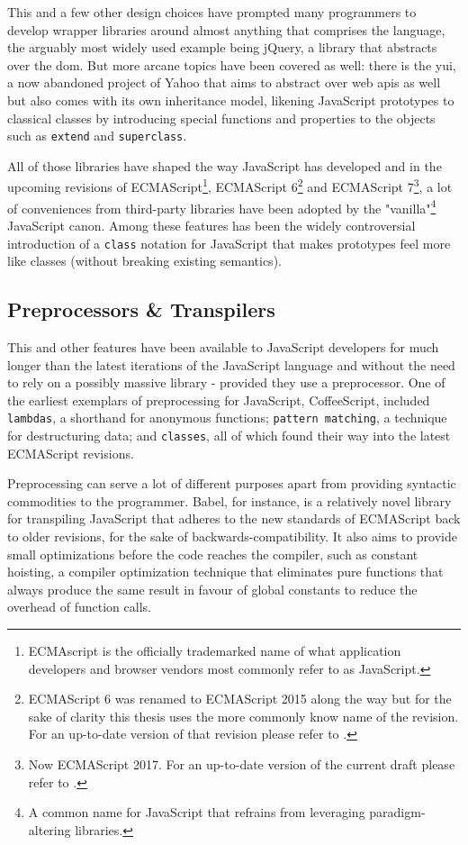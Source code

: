 \documentclass[oneside,11pt,xetex]{scrbook}
\begin{document}
This and a few other design choices have prompted many programmers to develop
wrapper libraries around almost anything that comprises the language, the arguably
most widely used example being jQuery, a library that abstracts over the \gls{dom}.
But more arcane topics have been covered as well: there is the \gls{yui}, a now abandoned
project of Yahoo that aims to abstract over web \glspl{api} as well but also comes with
its own inheritance model, likening JavaScript prototypes to classical classes by
introducing special functions and properties to the objects such as \texttt{extend}
and \texttt{superclass}.

All of those libraries have shaped the way JavaScript has developed and in the
upcoming revisions of ECMAScript\footnote{ECMAscript is the officially trademarked
name of what application developers and browser vendors most commonly refer to as
JavaScript.}, ECMAScript 6\footnote{ECMAScript 6 was renamed to ECMAScript 2015
along the way but for the sake of clarity this thesis uses the more commonly
know name of the revision. For an up-to-date version of that revision please
refer to \parencite{ECMA6}.} and ECMAScript 7\footnote{Now ECMAScript 2017. For
an up-to-date version of the current draft please refer to \parencite{ECMA7}.}, a
lot of conveniences from third-party libraries have been adopted by the
"vanilla"\footnote{A common name for JavaScript that refrains from leveraging
paradigm-altering libraries.} JavaScript canon.
Among these features has been the widely controversial introduction of a \texttt{class}
notation for JavaScript that makes prototypes feel more like classes (without
breaking existing semantics).

\subsection{Preprocessors \& Transpilers}
\label{pretrans}

This and other features have been available to JavaScript developers for much
longer than the latest iterations of the JavaScript language and without
the need to rely on a possibly massive library - provided they use a preprocessor.
One of the earliest exemplars of preprocessing for JavaScript, CoffeeScript, included
\texttt{lambdas}, a shorthand for anonymous functions; \texttt{pattern matching},
a technique for destructuring data; and \texttt{classes}, all of which found
their way into the latest ECMAScript revisions.

Preprocessing can serve a lot of different purposes apart from providing
syntactic commodities to the programmer. Babel, for instance, is a relatively
novel library for transpiling JavaScript that adheres to the new standards
of ECMAScript back to older revisions, for the sake of backwards-compatibility.
It also aims to provide small optimizations before the code reaches the compiler,
such as constant hoisting, a compiler optimization technique that eliminates
pure functions that always produce the same result in favour of global constants
to reduce the overhead of function calls.
\end{document}

